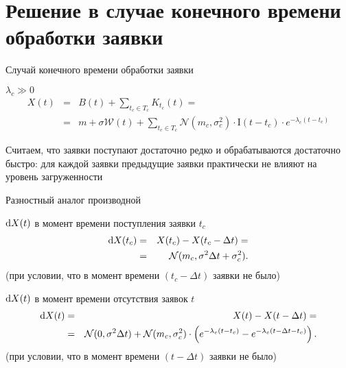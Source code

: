 \documentclass[utf8,handout]{beamer}
\begin{document}
\section[$\lambda_c \gg 0$]{Решение в случае конечного времени обработки заявки}
\begin{frame}{Случай конечного времени обработки заявки}
\begin{block}{$\lambda_c \gg 0$}
\begin{eqnarray*}
X(t) 
  &=& B(t) + \sum\limits_{t_c \in T_c}K_{t_c}(t) = \\
  &=& m + \sigma \mathcal{W}(t) + \sum\limits_{t_c \in T_c}
    \mathcal{N}(m_c, \sigma_c^2) \cdot \mathrm{I}(t - t_c) \cdot 
    e^{-\lambda_c(t - t_c)}
\end{eqnarray*}
\end{block}
Считаем, что заявки поступают достаточно редко и 
обрабатываются достаточно быстро: 
для каждой заявки предыдущие заявки практически не влияют на уровень
загруженности
\end{frame}


\begin{frame}{Разностный аналог производной}
\begin{block}{$\dif X(t)$ в момент времени поступления заявки $t_c$}
  \begin{eqnarray*}
  \dif X(t_c) 
    & = & X(t_c) - X(t_c - \Delta t) = \\
    & = & \mathcal{N}(m_c, \sigma^2 \Delta t + \sigma_c^2).
  \end{eqnarray*}
  (при условии, что в момент времени $(t_c - \Delta t)$ заявки не было)
\end{block}
\begin{block}{$\dif X(t)$ в момент времени отсутствия заявок $t$}
  \begin{eqnarray*}
  \dif X(t) 
    & = & X(t) - X(t - \Delta t) = \\
    & = & \mathcal{N}(0, \sigma^2 \Delta t) + 
        \mathcal{N}(m_c, \sigma_c^2) \cdot 
          \del{e^{-\lambda_c(t - t_c)} - e^{-\lambda_c(t - \Delta t - t_c)}}.
  \end{eqnarray*}
  (при условии, что в момент времени $(t - \Delta t)$ заявки не было)
\end{block}
\end{frame}
\end{document}
